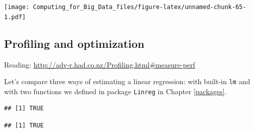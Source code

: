 \documentclass[]{book}
\newenvironment{Shaded}{\begin{snugshade}}{\end{snugshade}}
\newcommand{\KeywordTok}[1]{\textcolor[rgb]{0.13,0.29,0.53}{\textbf{#1}}}
\newcommand{\DataTypeTok}[1]{\textcolor[rgb]{0.13,0.29,0.53}{#1}}
\newcommand{\DecValTok}[1]{\textcolor[rgb]{0.00,0.00,0.81}{#1}}
\newcommand{\StringTok}[1]{\textcolor[rgb]{0.31,0.60,0.02}{#1}}
\newcommand{\OtherTok}[1]{\textcolor[rgb]{0.56,0.35,0.01}{#1}}
\newcommand{\OperatorTok}[1]{\textcolor[rgb]{0.81,0.36,0.00}{\textbf{#1}}}
\newcommand{\NormalTok}[1]{#1}
\theoremstyle{definition}
\theoremstyle{definition}
\theoremstyle{definition}
\theoremstyle{remark}
\begin{document}
\texttt{[image: Computing\_for\_Big\_Data\_files/figure-latex/unnamed-chunk-65-1.pdf]}

\subsection{Profiling and
optimization}\label{profiling-and-optimization}

Reading: \url{http://adv-r.had.co.nz/Profiling.html\#measure-perf}

Let's compare three ways of estimating a linear regression: with
built-in \texttt{lm} and with two functions we defined in package
\texttt{Linreg} in Chapter \ref{packages}.

\begin{Shaded}
\end{Shaded}

\begin{verbatim}
## [1] TRUE
\end{verbatim}

\begin{Shaded}
\end{Shaded}

\begin{verbatim}
## [1] TRUE
\end{verbatim}
\end{document}
